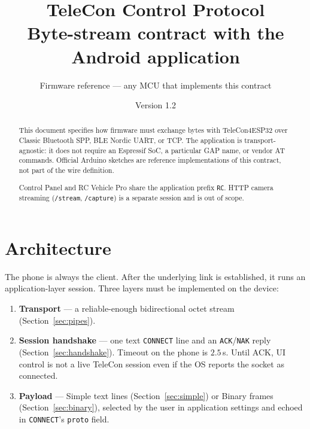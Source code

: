 \documentclass[12pt,a4paper]{article}
\title{TeleCon Control Protocol\\[0.4em]
\large Byte-stream contract with the Android application}
\author{Firmware reference --- any MCU that implements this contract}
\date{Version 1.2 \quad 2026}
\begin{document}
\maketitle

\begin{abstract}
This document specifies how firmware must exchange bytes with TeleCon4ESP32
over Classic Bluetooth SPP, BLE Nordic UART, or TCP.
The application is transport-agnostic: it does not require an Espressif SoC,
a particular GAP name, or vendor AT commands.
Official Arduino sketches are reference implementations of this contract,
not part of the wire definition.

Control Panel and RC Vehicle Pro share the application prefix \texttt{RC}.
HTTP camera streaming (\texttt{/stream}, \texttt{/capture}) is a separate
session and is out of scope.
\end{abstract}

\section{Architecture}
\label{sec:arch}

The phone is always the client. After the underlying link is established,
it runs an application-layer session. Three layers must be implemented
on the device:

\begin{enumerate}[leftmargin=1.6cm]
  \item \textbf{Transport} --- a reliable-enough bidirectional octet stream
        (Section~\ref{sec:pipes}).
  \item \textbf{Session handshake} --- one text \texttt{CONNECT} line and an
        \texttt{ACK}/\texttt{NAK} reply (Section~\ref{sec:handshake}).
        Timeout on the phone is $2.5$\,s. Until ACK, UI control is not a
        live TeleCon session even if the OS reports the socket as connected.
  \item \textbf{Payload} --- Simple text lines (Section~\ref{sec:simple}) or
        Binary frames (Section~\ref{sec:binary}), selected by the user in
        application settings and echoed in \texttt{CONNECT}'s \texttt{proto}
        field.
\end{enumerate}
\end{document}
